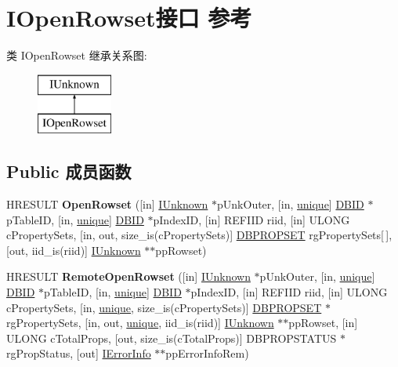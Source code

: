 \hypertarget{interface_i_open_rowset}{}\section{I\+Open\+Rowset接口 参考}
\label{interface_i_open_rowset}
类 I\+Open\+Rowset 继承关系图\+:\begin{figure}[H]
\begin{center}
\leavevmode
\includegraphics[height=2.000000cm]{interface_i_open_rowset}
\end{center}
\end{figure}
\subsection*{Public 成员函数}
\begin{DoxyCompactItemize}
\item 
\mbox{\label{interface_i_open_rowset_aaf5e72c5f833164d30bde62c3b72fca0}} 
H\+R\+E\+S\+U\+LT {\bfseries Open\+Rowset} (\mbox{[}in\mbox{]} \hyperlink{interface_i_unknown}{I\+Unknown} $\ast$p\+Unk\+Outer, \mbox{[}in, \hyperlink{interfaceunique}{unique}\mbox{]} \hyperlink{structtag_d_b_i_d}{D\+B\+ID} $\ast$p\+Table\+ID, \mbox{[}in, \hyperlink{interfaceunique}{unique}\mbox{]} \hyperlink{structtag_d_b_i_d}{D\+B\+ID} $\ast$p\+Index\+ID, \mbox{[}in\mbox{]} R\+E\+F\+I\+ID riid, \mbox{[}in\mbox{]} U\+L\+O\+NG c\+Property\+Sets, \mbox{[}in, out, size\+\_\+is(c\+Property\+Sets)\mbox{]} \hyperlink{structtag_d_b_p_r_o_p_s_e_t}{D\+B\+P\+R\+O\+P\+S\+ET} rg\+Property\+Sets\mbox{[}$\,$\mbox{]}, \mbox{[}out, iid\+\_\+is(riid)\mbox{]} \hyperlink{interface_i_unknown}{I\+Unknown} $\ast$$\ast$pp\+Rowset)
\item 
\mbox{\label{interface_i_open_rowset_a1d29bafd8466f40fcb5768a2eafeb493}} 
H\+R\+E\+S\+U\+LT {\bfseries Remote\+Open\+Rowset} (\mbox{[}in\mbox{]} \hyperlink{interface_i_unknown}{I\+Unknown} $\ast$p\+Unk\+Outer, \mbox{[}in, \hyperlink{interfaceunique}{unique}\mbox{]} \hyperlink{structtag_d_b_i_d}{D\+B\+ID} $\ast$p\+Table\+ID, \mbox{[}in, \hyperlink{interfaceunique}{unique}\mbox{]} \hyperlink{structtag_d_b_i_d}{D\+B\+ID} $\ast$p\+Index\+ID, \mbox{[}in\mbox{]} R\+E\+F\+I\+ID riid, \mbox{[}in\mbox{]} U\+L\+O\+NG c\+Property\+Sets, \mbox{[}in, \hyperlink{interfaceunique}{unique}, size\+\_\+is(c\+Property\+Sets)\mbox{]} \hyperlink{structtag_d_b_p_r_o_p_s_e_t}{D\+B\+P\+R\+O\+P\+S\+ET} $\ast$rg\+Property\+Sets, \mbox{[}in, out, \hyperlink{interfaceunique}{unique}, iid\+\_\+is(riid)\mbox{]} \hyperlink{interface_i_unknown}{I\+Unknown} $\ast$$\ast$pp\+Rowset, \mbox{[}in\mbox{]} U\+L\+O\+NG c\+Total\+Props, \mbox{[}out, size\+\_\+is(c\+Total\+Props)\mbox{]} D\+B\+P\+R\+O\+P\+S\+T\+A\+T\+US $\ast$rg\+Prop\+Status, \mbox{[}out\mbox{]} \hyperlink{interface_i_error_info}{I\+Error\+Info} $\ast$$\ast$pp\+Error\+Info\+Rem)
\end{DoxyCompactItemize}
